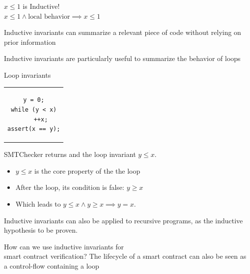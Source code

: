 \documentclass[aspectratio=169,10pt]{beamer}
\begin{document}
\begin{frame}
\begin{center}
$x \le 1$ is Inductive!\\
$x \le 1 \land \text{local behavior} \implies x \le 1$
\end{center}
\end{frame}

\begin{frame}{Inductive invariants}
	can summarize a relevant piece of code without relying on prior information
\end{frame}

\begin{frame}{Inductive invariants}
	are particularly useful to summarize the behavior of loops
\end{frame}

\begin{frame}[fragile]{Loop invariants}
\begin{center}
\begin{tabular}{c}
\begin{lstlisting}[basicstyle=\small]
y = 0;
while (y < x)
    ++x;
assert(x == y);
\end{lstlisting}
\end{tabular}
\end{center}
SMTChecker returns {\color{mLightPurple}{safe}} and the loop invariant $y \le x$.

\begin{itemize}
	\item $y \le x$ is the core property of the the loop
	\item After the loop, its condition is false: $y \ge x$
	\item Which leads to $y \le x \land y \ge x \implies y = x$.
\end{itemize}
\end{frame}

\begin{frame}{Inductive invariants}
	can also be applied to recursive programs,
	as the inductive hypothesis to be proven.
\end{frame}

\begin{frame}{How can we use inductive invariants for\\smart contract verification?}
	The lifecycle of a smart contract can also be seen as a control-flow containing a loop
\end{frame}
\end{document}
